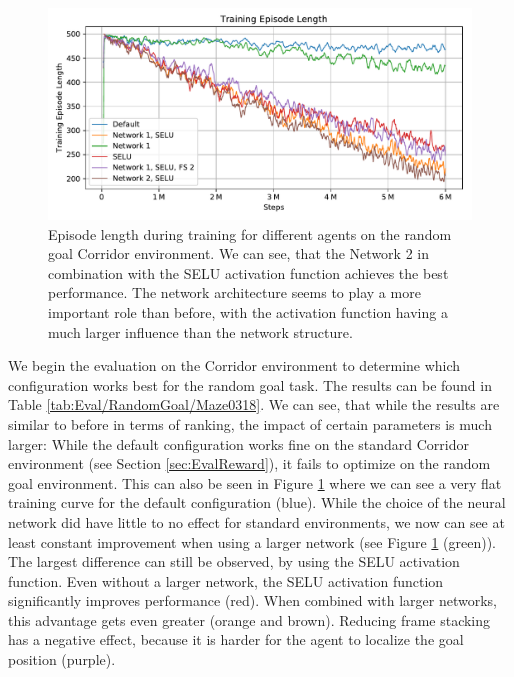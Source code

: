 \begin{figure}[htp]
    \begin{center}
        \includegraphics[clip, width=0.95\columnwidth]{figures/evaluation/randomness/goals/maze0318_episode_length.pdf}
    \end{center}
    \caption[Episode Length for Different Agents on the Random Goal Corridor Environment]{Episode length during training for different agents on the random goal Corridor environment. We can see, that the Network 2 in combination with the SELU activation function achieves the best performance. The network architecture seems to play a more important role than before, with the activation function having a much larger influence than the network structure.} \label{fig:Eval/RandomGoal/Maze0318}
\end{figure}

We begin the evaluation on the Corridor environment to determine which configuration works best for the random goal task. The results can be found in Table \ref{tab:Eval/RandomGoal/Maze0318}. We can see, that while the results are similar to before in terms of ranking, the impact of certain parameters is much larger: While the default configuration works fine on the standard Corridor environment (see Section \ref{sec:EvalReward}), it fails to optimize on the random goal environment. This can also be seen in Figure \ref{fig:Eval/RandomGoal/Maze0318} where we can see a very flat training curve for the default configuration (blue). While the choice of the neural network did have little to no effect for standard environments, we now can see at least constant improvement when using a larger network (see Figure \ref{fig:Eval/RandomGoal/Maze0318} (green)). The largest difference can still be observed, by using the SELU activation function. Even without a larger network, the SELU activation function significantly improves performance (red). When combined with larger networks, this advantage gets even greater (orange and brown). Reducing frame stacking has a negative effect, because it is harder for the agent to localize the goal position (purple). 

